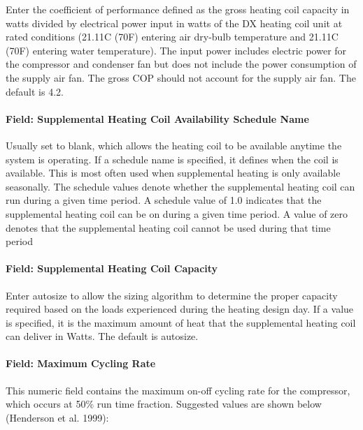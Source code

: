 Enter the coefficient of performance defined as the gross heating coil capacity in watts divided by electrical power input in watts of the DX heating coil unit at rated conditions (21.11C (70F) entering air dry-bulb temperature and 21.11C (70F) entering water temperature). The input power includes electric power for the compressor and condenser fan but does not include the power consumption of the supply air fan. The gross COP should not account for the supply air fan. The default is 4.2.

\paragraph{Field: Supplemental Heating Coil Availability Schedule Name}\label{field-supplemental-heating-coil-availability-schedule-name-1}

Usually set to blank, which allows the heating coil to be available anytime the system is operating. If a schedule name is specified, it defines when the coil is available. This is most often used when supplemental heating is only available seasonally. The schedule values denote whether the supplemental heating coil can run during a given time period. A schedule value of 1.0 indicates that the supplemental heating coil can be on during a given time period. A value of zero denotes that the supplemental heating coil cannot be used during that time period

\paragraph{Field: Supplemental Heating Coil Capacity}\label{field-supplemental-heating-coil-capacity-1}

Enter autosize to allow the sizing algorithm to determine the proper capacity required based on the loads experienced during the heating design day. If a value is specified, it is the maximum amount of heat that the supplemental heating coil can deliver in Watts. The default is autosize.

\paragraph{Field: Maximum Cycling Rate}\label{field-maximum-cycling-rate-000}

This numeric field contains the maximum on-off cycling rate for the compressor, which occurs at 50\% run time fraction. Suggested values are shown below (Henderson et al. 1999):

